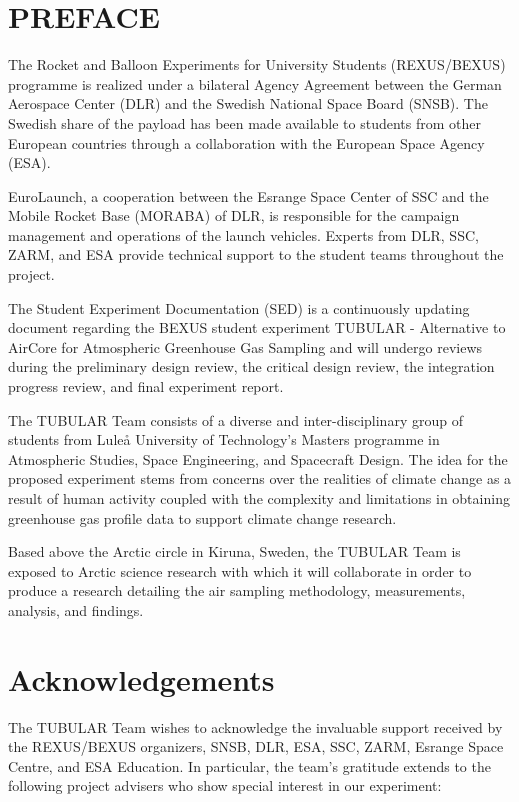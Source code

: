 \documentclass[a4paper,12pt,oneside]{article} %
\begin{document}
\section*{PREFACE} \markboth{}{}

The Rocket and Balloon Experiments for University Students (REXUS/BEXUS) programme is realized under a bilateral Agency Agreement between the German Aerospace Center (DLR) and the Swedish National Space Board (SNSB). The Swedish share of the
payload has been made available to students from other European countries through a collaboration with the European Space Agency (ESA).

EuroLaunch, a cooperation between the Esrange Space Center of SSC and the Mobile Rocket Base (MORABA) of DLR, is responsible for the campaign management and operations of the launch vehicles. Experts from DLR, SSC, ZARM, and ESA provide
technical support to the student teams throughout the project.

The Student Experiment Documentation (SED) is a continuously updating document regarding the BEXUS student experiment TUBULAR - Alternative to AirCore for Atmospheric Greenhouse Gas Sampling and will undergo reviews during the preliminary design review, the critical design review, the integration progress review, and final experiment report.

The TUBULAR Team consists of a diverse and inter-disciplinary group of students from Luleå University of Technology's Masters programme in Atmospheric Studies, Space Engineering, and Spacecraft Design. The idea for the proposed experiment stems from concerns over the realities of climate change as a result of human activity coupled with the complexity and limitations in obtaining greenhouse gas profile data to support climate change research.

Based above the Arctic circle in Kiruna, Sweden, the TUBULAR Team is exposed to Arctic science research with which it will collaborate in order to produce a research detailing the air sampling methodology, measurements, analysis, and findings.



\newpage
\section*{Acknowledgements} \markboth{}{}

The TUBULAR Team wishes to acknowledge the invaluable support received by the REXUS/BEXUS organizers, SNSB, DLR, ESA, SSC, ZARM, Esrange Space Centre, and ESA Education. In particular, the team's gratitude extends to the following project advisers who show special interest in our experiment:
\end{document}
